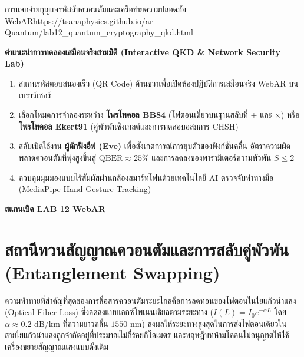 \begin{qrcodelabbox}{การแจกจ่ายกุญแจรหัสลับควอนตัมและเครือข่ายความปลอดภัย WebAR}{https://tsanaphysics.github.io/ar-Quantum/lab12_quantum_cryptography_qkd.html}
\begin{minipage}[c]{0.70\textwidth}
\textbf{คำแนะนำการทดลองเสมือนจริงสามมิติ (Interactive QKD \& Network Security Lab)}
\begin{enumerate}
    \item สแกนรหัสตอบสนองเร็ว (QR Code) ด้านขวาเพื่อเปิดห้องปฏิบัติการเสมือนจริง WebAR บนเบราว์เซอร์
    \item เลือกโหมดการจำลองระหว่าง \textbf{โพรโทคอล BB84} (โฟตอนเดี่ยวบนฐานสลับที่ $+$ และ $\times$) หรือ \textbf{โพรโทคอล Ekert91} (คู่พัวพันซิงเกลต์และการทดสอบอสมการ CHSH)
    \item สลับเปิดใช้งาน \textbf{ผู้ดักฟังอีฟ (Eve)} เพื่อสังเกตการณ์การยุบตัวของฟังก์ชันคลื่น อัตราความผิดพลาดควอนตัมที่พุ่งสูงขึ้นสู่ $\text{QBER} \approx 25\%$ และการลดลงของพารามิเตอร์ความพัวพัน $S \le 2$
    \item ควบคุมมุมมองแบบไร้สัมผัสผ่านกล้องสมาร์ทโฟนด้วยเทคโนโลยี AI ตรวจจับท่าทางมือ (MediaPipe Hand Gesture Tracking)
\end{enumerate}
\end{minipage}
\hfill
\begin{minipage}[c]{0.25\textwidth}
\centering
{}
\vspace{4pt}
\scriptsize\textbf{สแกนเปิด LAB 12 WebAR}
\end{minipage}
\end{qrcodelabbox}

\section{สถานีทวนสัญญาณควอนตัมและการสลับคู่พัวพัน (Entanglement Swapping)}

ความท้าทายที่สำคัญที่สุดของการสื่อสารควอนตัมระยะไกลคือการลดทอนของโฟตอนในใยแก้วนำแสง (Optical Fiber Loss) ซึ่งลดลงแบบเอกซ์โพเนนเชียลตามระยะทาง ($I(L) = I_0 e^{-\alpha L}$ โดย $\alpha \approx 0.2\text{ dB/km}$ ที่ความยาวคลื่น $1550\text{ nm}$) ส่งผลให้ระยะทางสูงสุดในการส่งโฟตอนเดี่ยวในสายใยแก้วนำแสงถูกจำกัดอยู่ที่ประมาณไม่กี่ร้อยกิโลเมตร และทฤษฎีบทห้ามโคลนไม่อนุญาตให้ใช้เครื่องขยายสัญญาณแสงแบบดั้งเดิม

